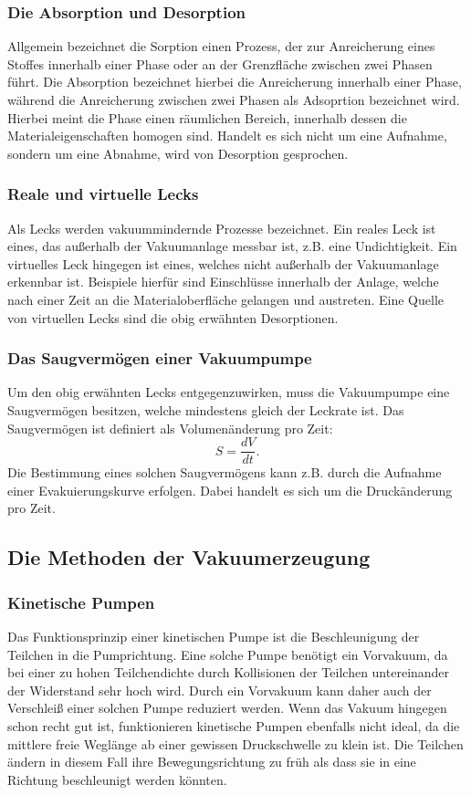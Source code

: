 \subsubsection*{Die Absorption und Desorption}
Allgemein bezeichnet die Sorption einen Prozess, der zur Anreicherung eines Stoffes
innerhalb einer Phase oder an der Grenzfläche zwischen zwei Phasen führt.
Die Absorption bezeichnet hierbei die Anreicherung innerhalb einer Phase, während die
Anreicherung zwischen zwei Phasen als Adsoprtion bezeichnet wird. Hierbei meint die Phase
einen räumlichen Bereich, innerhalb dessen die Materialeigenschaften homogen sind.
Handelt es sich nicht um eine Aufnahme, sondern um eine Abnahme, wird von Desorption gesprochen.

\subsubsection*{Reale und virtuelle Lecks}
Als Lecks werden vakuummindernde Prozesse bezeichnet. Ein reales Leck ist eines,
das außerhalb der Vakuumanlage messbar ist, z.B. eine Undichtigkeit. Ein virtuelles
Leck hingegen ist eines, welches nicht außerhalb der Vakuumanlage erkennbar ist.
Beispiele hierfür sind Einschlüsse innerhalb der Anlage, welche nach einer Zeit an
die Materialoberfläche gelangen und austreten.
Eine Quelle von virtuellen Lecks sind die obig erwähnten Desorptionen.

\subsubsection*{Das Saugvermögen einer Vakuumpumpe}
Um den obig erwähnten Lecks entgegenzuwirken, muss die Vakuumpumpe eine Saugvermögen
besitzen, welche mindestens gleich der Leckrate ist. Das Saugvermögen ist definiert
als Volumenänderung pro Zeit:
\begin{equation}
 S = \frac{dV}{dt}.
\end{equation}
Die Bestimmung eines solchen Saugvermögens kann z.B. durch die Aufnahme einer
Evakuierungskurve erfolgen. Dabei handelt es sich um die Druckänderung pro Zeit.

\subsection{Die Methoden der Vakuumerzeugung}

\subsubsection*{Kinetische Pumpen}
Das Funktionsprinzip einer kinetischen Pumpe ist die Beschleunigung der Teilchen in
die Pumprichtung. Eine solche Pumpe benötigt ein Vorvakuum, da bei einer zu hohen
Teilchendichte durch Kollisionen der Teilchen untereinander der Widerstand sehr hoch wird.
Durch ein Vorvakuum kann daher auch der Verschleiß einer solchen Pumpe reduziert werden.
Wenn das Vakuum hingegen schon recht gut ist, funktionieren kinetische Pumpen ebenfalls nicht
ideal, da die mittlere freie Weglänge ab einer gewissen Druckschwelle zu klein ist.
Die Teilchen ändern in diesem Fall ihre Bewegungsrichtung zu früh als dass sie in eine Richtung
beschleunigt werden könnten.

